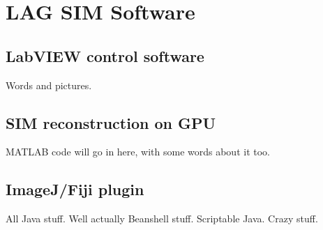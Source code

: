 \chapter{LAG SIM Software} 

\section{LabVIEW control software}
Words and pictures.

\section{SIM reconstruction on GPU}
MATLAB code will go in here, with some words about it too. 

\section{ImageJ/Fiji plugin}
All Java stuff. Well actually Beanshell stuff. Scriptable Java. Crazy stuff. 
